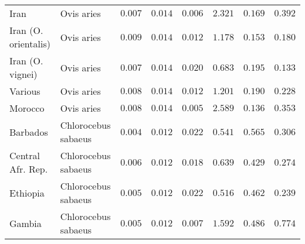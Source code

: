 \documentclass[12pt]{article}
\begin{document}
\begin{center}
\begin{longtable*}{|l|l|r|r|r|r|r|r|}
            Iran &          Ovis aries &               $ 0.007$ &              $ 0.014$ &              $ 0.006$ &                                          $ 2.321$ &                         $ 0.169$ &                      $ 0.392$ \\
            Iran (O. orientalis) &          Ovis aries &               $ 0.009$ &              $ 0.014$ &              $ 0.012$ &                                          $ 1.178$ &                         $ 0.153$ &                      $ 0.180$ \\
            Iran (O. vignei) &          Ovis aries &               $ 0.007$ &              $ 0.014$ &              $ 0.020$ &                                          $ 0.683$ &                         $ 0.195$ &                      $ 0.133$ \\
            Various &          Ovis aries &               $ 0.008$ &              $ 0.014$ &              $ 0.012$ &                                          $ 1.201$ &                         $ 0.190$ &                      $ 0.228$ \\
            Morocco &          Ovis aries &               $ 0.008$ &              $ 0.014$ &              $ 0.005$ &                                          $ 2.589$ &                         $ 0.136$ &                      $ 0.353$ \\
             Barbados & Chlorocebus sabaeus &               $ 0.004$ &              $ 0.012$ &              $ 0.022$ &                                          $ 0.541$ &                         $ 0.565$ &                      $ 0.306$ \\
             Central Afr. Rep. & Chlorocebus sabaeus &               $ 0.006$ &              $ 0.012$ &              $ 0.018$ &                                          $ 0.639$ &                         $ 0.429$ &                      $ 0.274$ \\
             Ethiopia & Chlorocebus sabaeus &               $ 0.005$ &              $ 0.012$ &              $ 0.022$ &                                          $ 0.516$ &                         $ 0.462$ &                      $ 0.239$ \\
             Gambia & Chlorocebus sabaeus &               $ 0.005$ &              $ 0.012$ &              $ 0.007$ &                                          $ 1.592$ &                         $ 0.486$ &                      $ 0.774$ \\

\end{longtable*}
\end{center}
\end{document}
